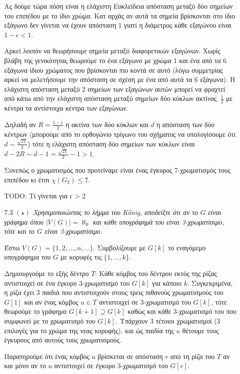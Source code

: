 \documentclass[a4paper, oneside, 11pt]{article}
\theoremstyle{definition}
\begin{document}
\begin{enumerate}
   Ας δούμε τώρα πόση είναι η ελάχιστη Ευκλείδεια απόσταση μεταξύ δύο
   σημείων του επιπέδου με το ίδιο χρώμα. Κατ αρχάς αν αυτά τα σημεία
   βρίσκονται στο ίδιο εξάγωνο δεν γίνεται να έχουν απόσταση 1 γιατί
   η διάμετρος κάθε εξαγώνου είναι $1 - \epsilon < 1$.
   
   Αρκεί λοιπόν να θεωρήσουμε σημεία μεταξύ διαφορετικών εξαγώνων.
   Χωρίς βλάβη της γενικότητας
   θεωρούμε το ένα εξάγωνο με χρώμα 1 και ένα από τα 6 εξάγωνα
   ίδιου χρώματος που βρίσκονται
   πιο κοντά σε αυτό (λόγω συμμετρίας αρκεί να μελετήσουμε την απόσταση
   σε σχέση με ένα από αυτά τα 6 εξάγωνα). Η ελάχιστη απόσταση μεταξύ 2
   σημείων των εξαγώνων αυτών μπορεί να φραχτεί από κάτω από την
   ελάχιστη απόσταση μεταξύ σημείων δύο κύκλων ακτίνας $~\frac{1}{2}$
   με κέντρα τα αντίστοιχα κέντρα των εξαγώνων.

   Δηλαδή αν $R = \frac{1-\epsilon}{2}$
   η ακτίνα των δύο κύκλων και $d$ η απόσταση των δύο κέντρων
   (μπορούμε από το ορθογώνιο τρίγωνο του σχήματος να υπολογίσουμε
   ότι $d \sim \frac{\sqrt{21}}{2}$) τότε η ελάχιστη απόσταση
   δύο σημείων των κύκλων είναι $d - 2R \sim d - 1
   = \frac{\sqrt{21}}{2} - 1 > 1$.

   Συνεπώς ο χρωματισμός που προτείναμε είναι ένας έγκυρος 7-χρωματισμός
   τους επιπέδου κι έτσι $\chi(G_2) \leq 7$.

   TODO: Τί γίνεται για r > 2

   \item[7.3] \emph{$(\star)$ Χρησιμοποιώντας το λήμμα του K\H{o}nig, αποδείξτε
   ότι αν το $G$ είναι γράφημα όπου $|V(G)| = \aleph_0$ και κάθε υπογράφημά
   του είναι 3-χρωματίσιμο, τότε και το $G$ είναι 3-χρωματίσιμο.}

   Έστω $V(G) = \{ 1, 2, \ldots, n, \ldots \}$. Συμβολίζουμε με $G[k]$
   το εναγόμεμο υπογράφημα του $G$ με κορυφές τις $\{1, \ldots, k\}$.

   Δημιουργούμε το εξής δέντρο $T$: Κάθε κόμβος του δέντρου εκτός της ρίζας
   αντιστοιχεί σε ένα έγκυρο 3-χρωματισμό του $G[k]$ για κάποιο $k$.
   Συγκεκριμένα, η ρίζα έχει 3 παιδιά που αντιστοιχούν στους τρεις πιθανούς
   χρωματισμούς του $G[1]$ και αν ένας κόμβος $u \in T$ αντιστοιχεί σε
   3-χρωματισμό
   του $G[k]$, τότε θεωρούμε το γράφημα $G[k+1] \supseteq G[k]$ καθώς και κάθε
   3-χρωματισμό του που συμφωνεί με το χρωματισμό του $G[k]$. Υπάρχουν
   3 τέτοιοι χρωματισμοί (3 επιλογές για το χρώμα της νεας κορυφής).
   και ώς παιδία της $u$ θέτουμε τους έγκυρους από αυτούς
   τους χρωματισμούς.

   Παρατηρούμε ότι ένας κόμβος $u$ βρίσκεται σε απόσταση $r$ από τη ρίζα
   του $T$ αν και μόνο αν το $u$ αντιστοιχεί σε έγκυρο 3-χρωματισμό
   του $G[r]$.


\end{enumerate}
\end{document}
